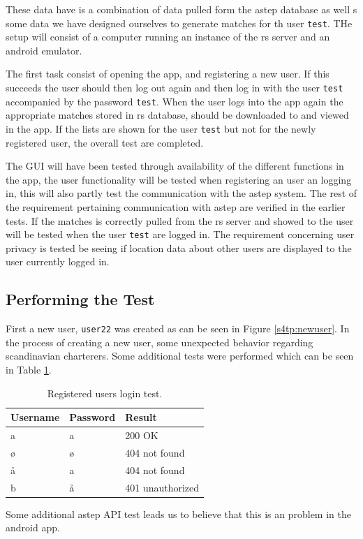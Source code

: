 These data have is a combination of data pulled form the \gls{astep} database as well s some data we have designed ourselves to generate matches for th user \texttt{test}.
THe setup will consist of a computer running an instance of the \gls{rs} server and an android emulator.

The first task consist of opening the app, and registering a new user. If this succeeds the user should then log out again and then log in with the user \texttt{test} accompanied by the password \texttt{test}.
When the user logs into the app again the appropriate matches stored in \gls{rs} database, should be downloaded to and viewed in the app.
If the lists are shown for the user \texttt{test} but not for the newly registered user, the overall test are completed. 

The GUI will have been tested through availability of the different functions in the app, the user functionality will be tested when registering an user an logging in, this will also partly test the communication with the \gls{astep} system.
The rest of the requirement pertaining communication with \gls{astep} are verified in the earlier tests.
If the matches is correctly pulled from the \gls{rs} server and showed to the user will be tested when the user \texttt{test} are logged in.
The requirement concerning user privacy is tested be seeing if location data about other users are displayed to the user currently logged in. 


\subsection{Performing the Test}
First a new user, \texttt{user22} was created as can be seen in Figure \ref{s4tp:newuser}.
In the process of creating a new user, some unexpected behavior regarding scandinavian charterers.
Some additional tests were performed which can be seen in Table \ref{tab:logintest}.
\begin{table}[!ht]
	\centering
	\begin{tabular}{@{}lll@{}}
		Username & Password & Result \\
		\hline
		a & a & 200 OK\\
		ø & ø & 404 not found\\
		å & a & 404 not found\\
		b & å & 401 unauthorized\\
	\end{tabular}
	\caption{Registered users login test.}
	\label{tab:logintest}
\end{table}
Some additional \gls{astep} API test leads us to believe that this is an problem in the android app.

